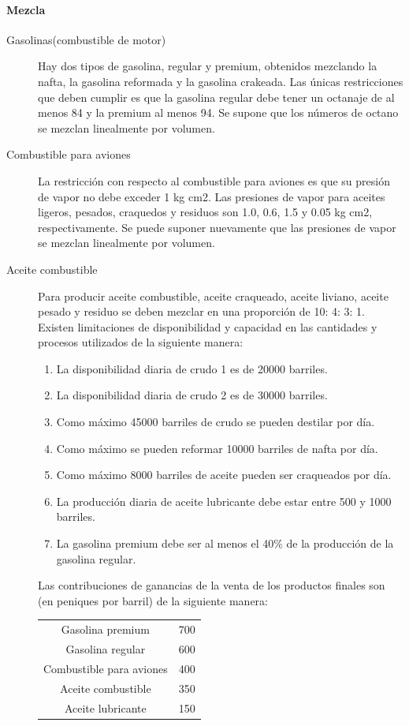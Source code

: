\paragraph{Mezcla}
\begin{description}
\item[Gasolinas(combustible de motor)] Hay dos tipos de gasolina, regular y premium, obtenidos mezclando la nafta, la gasolina reformada y la gasolina crakeada. Las únicas restricciones que deben cumplir es que la gasolina regular debe tener un octanaje de al menos 84 y la premium al menos 94. Se supone que los números de octano se mezclan linealmente por volumen.
\item[Combustible para aviones] La restricción con respecto al combustible para aviones es que su presión de vapor no debe exceder 1 kg cm2. Las presiones de vapor para aceites ligeros, pesados, craquedos y residuos son 1.0, 0.6, 1.5 y 0.05 kg cm2, respectivamente. Se puede suponer nuevamente que las presiones de vapor se mezclan linealmente por volumen.
\item[Aceite combustible] Para producir aceite combustible, aceite craqueado, aceite liviano, aceite pesado y residuo se deben mezclar en una proporción de 10: 4: 3: 1.\\
Existen limitaciones de disponibilidad y capacidad en las cantidades y procesos utilizados de la siguiente manera:
\begin{enumerate}
\item La disponibilidad diaria de crudo 1 es de 20000 barriles.
\item La disponibilidad diaria de crudo 2 es de 30000 barriles.
\item Como máximo 45000 barriles de crudo se pueden destilar por día.
\item Como máximo se pueden reformar 10000 barriles de nafta por día.
\item Como máximo 8000 barriles de aceite pueden ser craqueados por día.
\item La producción diaria de aceite lubricante debe estar entre 500 y 1000 barriles.
\item La gasolina premium debe ser al menos el 40\% de la producción de la gasolina regular.
\end{enumerate}
Las contribuciones de ganancias de la venta de los productos finales son (en peniques por barril) de la siguiente manera:\\
\begin{center}
\begin{tabular}{cc}
\hline 
Gasolina premium & 700 \\ 
Gasolina regular & 600 \\ 
Combustible para aviones & 400 \\ 
Aceite combustible & 350 \\ 
Aceite lubricante & 150 \\ 
\hline 
\end{tabular} 
\end{center}
\end{description}
